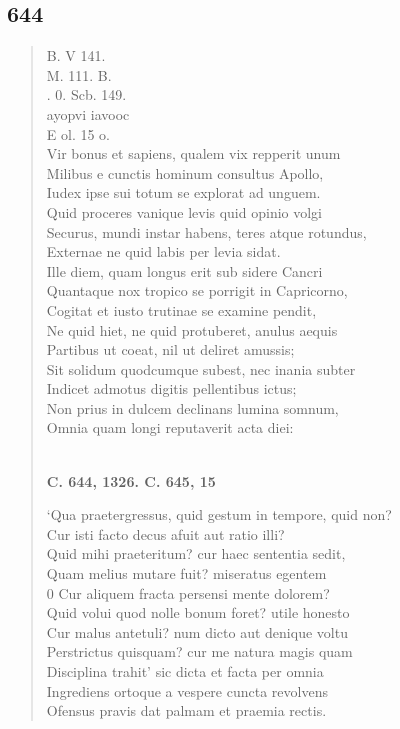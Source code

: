 \documentclass[11pt, a4paper]{report}
\begin{document}
            \subsection*{644}
      \begin{verse}
      B. V 141. \\ M. 111. B. \\ . 0. Scb. 149. \\ ayopvi iavooc \\ E ol. 15 o. \\ Vir bonus et sapiens, qualem vix repperit unum \\ Milibus e cunctis hominum consultus Apollo, \\ Iudex ipse sui totum se explorat ad unguem. \\ Quid proceres vanique levis quid opinio volgi \\ Securus, mundi instar habens, teres atque rotundus, \\ Externae ne quid labis per levia sidat. \\ Ille diem, quam longus erit sub sidere Cancri \\ Quantaque nox tropico se porrigit in Capricorno, \\ Cogitat et iusto trutinae se examine pendit, \\ Ne quid hiet, ne quid protuberet, anulus aequis \\ Partibus ut coeat, nil ut deliret amussis; \\ Sit solidum quodcumque subest, nec inania subter \\ Indicet admotus digitis pellentibus ictus; \\ Non prius in dulcem declinans lumina somnum, \\ Omnia quam longi reputaverit acta diei: \\ 
        ﻿\pagebreak 
    \begin{center} \textbf{C. 644, 1326. C. 645, 15} \end{center} \marginpar{[111]} ‘Qua praetergressus, quid gestum in tempore, quid non? \\ Cur isti facto decus afuit aut ratio illi? \\ Quid mihi praeteritum? cur haec sententia sedit, \\ Quam melius mutare fuit? miseratus egentem \\ 0 Cur aliquem fracta persensi mente dolorem? \\ Quid volui quod nolle bonum foret? utile honesto \\ Cur malus antetuli? num dicto aut denique voltu \\ Perstrictus quisquam? cur me natura magis quam \\ Disciplina trahit’ sic dicta et facta per omnia \\ Ingrediens ortoque a vespere cuncta revolvens \\ Ofensus pravis dat palmam et praemia rectis. \\ 
      \end{verse}
  
\end{document}
